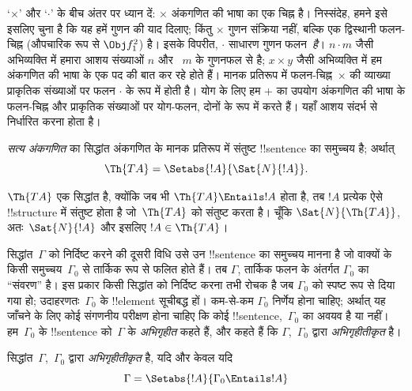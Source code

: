 \documentclass[../../../include/open-logic-section]{subfiles}
\begin{document}
`$\times$' और `$\cdot$' के बीच अंतर पर ध्यान दें: $\times$ अंकगणित की भाषा
का एक चिह्न है। निस्संदेह, हमने इसे इसलिए चुना है कि यह हमें गुणन की याद
दिलाए; किंतु $\times$ गुणन संक्रिया नहीं, बल्कि एक द्विस्थानी फलन-चिह्न
(औपचारिक रूप से $\Obj f^2_1$) है। इसके विपरीत, $\cdot$ साधारण गुणन
फलन~\emph{है}। $n \cdot m$ जैसी अभिव्यक्ति में हमारा आशय संख्याओं $n$ और
~$m$ के गुणनफल से है; $x \times y$ जैसी अभिव्यक्ति में हम अंकगणित की भाषा
के एक पद की बात कर रहे होते हैं। मानक प्रतिरूप में फलन-चिह्न~$\times$ की
व्याख्या प्राकृतिक संख्याओं पर फलन $\cdot$ के रूप में होती है। योग के लिए हम
$+$ का उपयोग अंकगणित की भाषा के फलन-चिह्न और प्राकृतिक संख्याओं पर योग-फलन,
दोनों के रूप में करते हैं। यहाँ आशय संदर्भ से निर्धारित करना होता है।

\begin{defn}
\emph{सत्य अंकगणित} का सिद्धांत अंकगणित के मानक प्रतिरूप में संतुष्ट
!!{sentence} का समुच्चय है; अर्थात्
\[
\Th{TA} = \Setabs{!A}{\Sat{N}{!A}}.
\]
\end{defn}

$\Th{TA}$ एक सिद्धांत है, क्योंकि जब भी $\Th{TA} \Entails !A$ होता है, तब
$!A$ प्रत्येक ऐसे !!{structure} में संतुष्ट होता है जो~$\Th{TA}$ को संतुष्ट
करता है। चूँकि $\Sat{N}{\Th{TA}}$, अतः~$\Sat{N}{!A}$ और इसलिए $!A \in
\Th{TA}$।

सिद्धांत~$\Gamma$ को निर्दिष्ट करने की दूसरी विधि उसे उन !!{sentence} का
समुच्चय मानना है जो वाक्यों के किसी समुच्चय~$\Gamma_0$ से तार्किक रूप से
फलित होते हैं। तब $\Gamma$, तार्किक फलन के अंतर्गत $\Gamma_0$ का ``संवरण''
है। इस प्रकार किसी सिद्धांत को निर्दिष्ट करना तभी रोचक है जब $\Gamma_0$ को
स्पष्ट रूप से दिया गया हो; उदाहरणतः~$\Gamma_0$ के !!{element} सूचीबद्ध हों।
कम-से-कम $\Gamma_0$ निर्णेय होना चाहिए; अर्थात् यह जाँचने के लिए कोई संगणनीय
परीक्षण होना चाहिए कि कोई !!{sentence},~$\Gamma_0$ का अवयव है या नहीं।
हम~$\Gamma_0$ के !!{sentence} को~$\Gamma$ के \emph{अभिगृहीत} कहते हैं, और
कहते हैं कि $\Gamma$,~$\Gamma_0$ द्वारा \emph{अभिगृहीतीकृत} है।

\begin{defn}
सिद्धांत~$\Gamma$,~$\Gamma_0$ द्वारा \emph{अभिगृहीतीकृत} है, यदि और केवल यदि
\[
\Gamma = \Setabs{!A}{\Gamma_0 \Entails !A}
\]
\end{defn}
\end{document}
